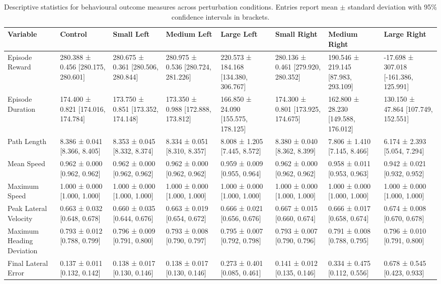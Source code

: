 \begin{table}[t]
\centering
\caption{Descriptive statistics for behavioural outcome measures across perturbation conditions. Entries report mean $\pm$ standard deviation with 95\% confidence intervals in brackets.}
\label{tab:descriptive_statistics}
\begin{tabular}{lp{2.5cm}p{2.5cm}p{2.5cm}p{2.5cm}p{2.5cm}p{2.5cm}p{2.5cm}}
\hline
Variable & Control & Small Left & Medium Left & Large Left & Small Right & Medium Right & Large Right \\
\hline
Episode Reward & 280.388 ± 0.456 [280.175, 280.601] & 280.675 ± 0.361 [280.506, 280.844] & 280.975 ± 0.536 [280.724, 281.226] & 220.573 ± 184.168 [134.380, 306.767] & 280.136 ± 0.461 [279.920, 280.352] & 190.546 ± 219.145 [87.983, 293.109] & -17.698 ± 307.018 [-161.386, 125.991] \\
Episode Duration & 174.400 ± 0.821 [174.016, 174.784] & 173.750 ± 0.851 [173.352, 174.148] & 173.350 ± 0.988 [172.888, 173.812] & 166.850 ± 24.090 [155.575, 178.125] & 174.300 ± 0.801 [173.925, 174.675] & 162.800 ± 28.230 [149.588, 176.012] & 130.150 ± 47.864 [107.749, 152.551] \\
Path Length & 8.386 ± 0.041 [8.366, 8.405] & 8.353 ± 0.045 [8.332, 8.374] & 8.334 ± 0.051 [8.310, 8.357] & 8.008 ± 1.205 [7.445, 8.572] & 8.380 ± 0.040 [8.362, 8.399] & 7.806 ± 1.410 [7.145, 8.466] & 6.174 ± 2.393 [5.054, 7.294] \\
Mean Speed & 0.962 ± 0.000 [0.962, 0.962] & 0.962 ± 0.000 [0.962, 0.962] & 0.962 ± 0.000 [0.962, 0.962] & 0.959 ± 0.009 [0.955, 0.964] & 0.962 ± 0.000 [0.962, 0.962] & 0.958 ± 0.011 [0.953, 0.963] & 0.942 ± 0.021 [0.932, 0.952] \\
Maximum Speed & 1.000 ± 0.000 [1.000, 1.000] & 1.000 ± 0.000 [1.000, 1.000] & 1.000 ± 0.000 [1.000, 1.000] & 1.000 ± 0.000 [1.000, 1.000] & 1.000 ± 0.000 [1.000, 1.000] & 1.000 ± 0.000 [1.000, 1.000] & 1.000 ± 0.000 [1.000, 1.000] \\
Peak Lateral Velocity & 0.663 ± 0.032 [0.648, 0.678] & 0.660 ± 0.035 [0.644, 0.676] & 0.663 ± 0.019 [0.654, 0.672] & 0.666 ± 0.021 [0.656, 0.676] & 0.667 ± 0.015 [0.660, 0.674] & 0.666 ± 0.017 [0.658, 0.674] & 0.674 ± 0.008 [0.670, 0.678] \\
Maximum Heading Deviation & 0.793 ± 0.012 [0.788, 0.799] & 0.796 ± 0.009 [0.791, 0.800] & 0.793 ± 0.008 [0.790, 0.797] & 0.795 ± 0.007 [0.792, 0.798] & 0.793 ± 0.007 [0.790, 0.796] & 0.791 ± 0.008 [0.788, 0.795] & 0.796 ± 0.010 [0.791, 0.800] \\
Final Lateral Error & 0.137 ± 0.011 [0.132, 0.142] & 0.138 ± 0.017 [0.130, 0.146] & 0.138 ± 0.017 [0.130, 0.146] & 0.273 ± 0.401 [0.085, 0.461] & 0.141 ± 0.012 [0.135, 0.146] & 0.334 ± 0.475 [0.112, 0.556] & 0.678 ± 0.545 [0.423, 0.933] \\
\hline
\end{tabular}
\end{table}
